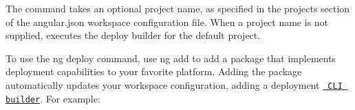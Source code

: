 The command takes an optional project name, as specified in the {\ttfamily projects} section of the {\ttfamily angular.\+json} workspace configuration file. When a project name is not supplied, executes the {\ttfamily deploy} builder for the default project.

To use the {\ttfamily ng deploy} command, use {\ttfamily ng add} to add a package that implements deployment capabilities to your favorite platform. Adding the package automatically updates your workspace configuration, adding a deployment \href{guide/cli-builder}{\texttt{ CLI builder}}. For example\+:


\begin{DoxyCode}{0}
\DoxyCodeLine{                \}}
\DoxyCodeLine{            \}}
\DoxyCodeLine{        \}}
\DoxyCodeLine{    \}}

\end{DoxyCode}
 